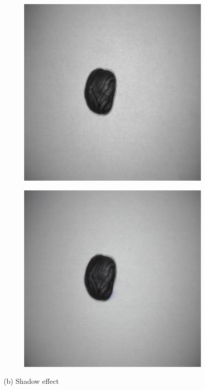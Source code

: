 \documentclass[12pt,DIV14,BCOR12mm,a4paper,footinclude=false,headinclude,parskip=half-,twoside,openright,cleardoublepage=empty,toc=index,bibliography=totoc,listof=totoc]{scrreprt}
\numberwithin{equation}{chapter}
\begin{document}
\begin{figure}
    \vspace{0.3cm} %

    \begin{subfigure}[t]{0.24\textwidth}
        \centering
        \includegraphics[width=\textwidth]{../media/diff_nuts_shadow_real.png}
    \end{subfigure}%
    \hspace{0.02\textwidth}
    \begin{subfigure}[t]{0.24\textwidth}
        \centering
        \includegraphics[width=\textwidth]{../media/diff_nuts_shadow_fake.png}
    \end{subfigure}
    \caption*{(b) Shadow effect}


\end{figure}
\end{document}
